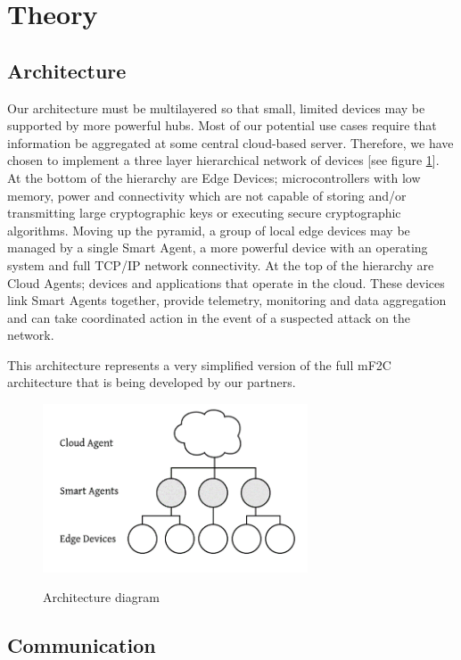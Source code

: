 \documentclass{article}
\begin{document}
\section{Theory}
\subsection{Architecture}

Our architecture must be multilayered so that small, limited devices may be supported by more powerful hubs. Most of our potential use cases require that information be aggregated at some central cloud-based server. Therefore, we have chosen to implement a three layer hierarchical network of devices [see figure \ref{fig:simplified_architecture}]. At the bottom of the hierarchy are Edge Devices; microcontrollers with low memory, power and connectivity which are not capable of storing and/or transmitting large cryptographic keys or executing secure cryptographic algorithms. Moving up the pyramid, a group of local edge devices may be managed by a single Smart Agent, a more powerful device with an operating system and full TCP/IP network connectivity. At the top of the hierarchy are Cloud Agents; devices and applications that operate in the cloud. These devices link Smart Agents together, provide telemetry, monitoring and data aggregation and can take coordinated action in the event of a suspected attack on the network.

This architecture represents a very simplified version of the full mF2C architecture that is being developed by our partners.


\begin{figure}[h]
  \centering
    \includegraphics[width=0.7\textwidth]{simplified_architecture}
    \label{fig:simplified_architecture}
    \caption{Architecture diagram}
\end{figure}


\subsection{Communication}
\end{document}
